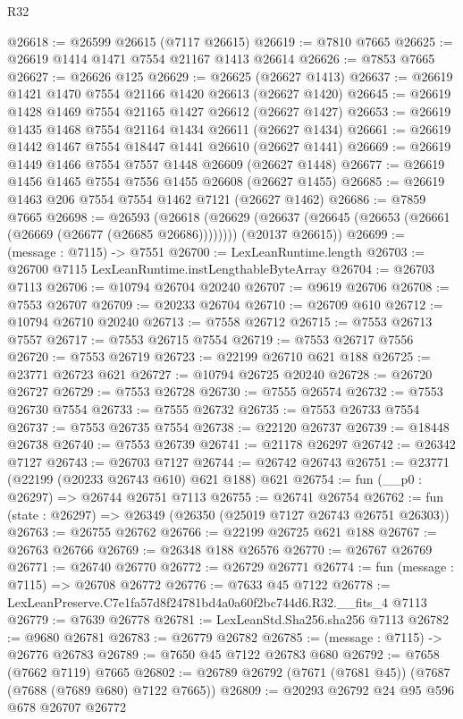 \begin{lexlean}{R32}
\begin{coremodule}
@26618 := @26599 @26615 (@7117 @26615)
@26619 := @7810 @7665
@26625 := @26619 @1414 @1471 @7554 @21167 @1413 @26614
@26626 := @7853 @7665
@26627 := @26626 @125
@26629 := @26625 (@26627 @1413)
@26637 := @26619 @1421 @1470 @7554 @21166 @1420 @26613 (@26627 @1420)
@26645 := @26619 @1428 @1469 @7554 @21165 @1427 @26612 (@26627 @1427)
@26653 := @26619 @1435 @1468 @7554 @21164 @1434 @26611 (@26627 @1434)
@26661 := @26619 @1442 @1467 @7554 @18447 @1441 @26610 (@26627 @1441)
@26669 := @26619 @1449 @1466 @7554 @7557 @1448 @26609 (@26627 @1448)
@26677 := @26619 @1456 @1465 @7554 @7556 @1455 @26608 (@26627 @1455)
@26685 := @26619 @1463 @206 @7554 @7554 @1462 @7121 (@26627 @1462)
@26686 := @7859 @7665
@26698 := @26593
    (@26618
      (@26629 (@26637 (@26645 (@26653 (@26661 (@26669 (@26677 (@26685 @26686))))))))
      (@20137 @26615))
@26699 := (message : @7115) -> @7551
@26700 := LexLeanRuntime.length
@26703 := @26700 @7115 LexLeanRuntime.instLengthableByteArray
@26704 := @26703 @7113
@26706 := @10794 @26704 @20240
@26707 := @9619 @26706
@26708 := @7553 @26707
@26709 := @20233 @26704
@26710 := @26709 @610
@26712 := @10794 @26710 @20240
@26713 := @7558 @26712
@26715 := @7553 @26713 @7557
@26717 := @7553 @26715 @7554
@26719 := @7553 @26717 @7556
@26720 := @7553 @26719
@26723 := @22199 @26710 @621 @188
@26725 := @23771 @26723 @621
@26727 := @10794 @26725 @20240
@26728 := @26720 @26727
@26729 := @7553 @26728
@26730 := @7555 @26574
@26732 := @7553 @26730 @7554
@26733 := @7555 @26732
@26735 := @7553 @26733 @7554
@26737 := @7553 @26735 @7554
@26738 := @22120 @26737
@26739 := @18448 @26738
@26740 := @7553 @26739
@26741 := @21178 @26297
@26742 := @26342 @7127
@26743 := @26703 @7127
@26744 := @26742 @26743
@26751 := @23771 (@22199 (@20233 @26743 @610) @621 @188) @621
@26754 := fun (__p0 : @26297) => @26744 @26751 @7113
@26755 := @26741 @26754
@26762 := fun (state : @26297) => @26349 (@26350 (@25019 @7127 @26743 @26751 @26303))
@26763 := @26755 @26762
@26766 := @22199 @26725 @621 @188
@26767 := @26763 @26766
@26769 := @26348 @188 @26576
@26770 := @26767 @26769
@26771 := @26740 @26770
@26772 := @26729 @26771
@26774 := fun (message : @7115) => @26708 @26772
@26776 := @7633 @45 @7122
@26778 := LexLeanPreserve.C7e1fa57d8f24781bd4a0a60f2bc744d6.R32.__fits_4 @7113
@26779 := @7639 @26778
@26781 := LexLeanStd.Sha256.sha256 @7113
@26782 := @9680 @26781
@26783 := @26779 @26782
@26785 := (message : @7115) -> @26776 @26783
@26789 := @7650 @45 @7122 @26783 @680
@26792 := @7658 (@7662 @7119) @7665
@26802 := @26789 @26792 (@7671 (@7681 @45)) (@7687 (@7688 (@7689 @680) @7122 @7665))
@26809 := @20293 @26792 @24 @95 @596 @678 @26707 @26772

\end{coremodule}
\end{lexlean}
